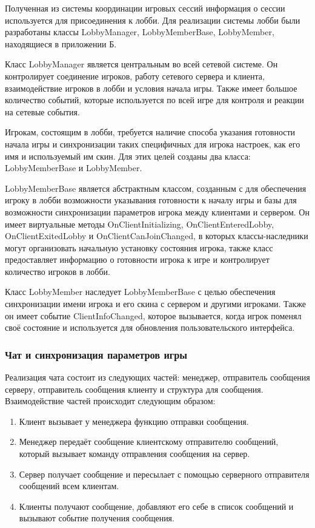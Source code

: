 Полученная из системы координации игровых сессий информация о сессии используется для присоединения к лобби. Для реализации системы лобби были разработаны классы LobbyManager, LobbyMemberBase, LobbyMember, находящиеся в приложении Б.

Класс LobbyManager является центральным во всей сетевой системе. Он контролирует соединение игроков, работу сетевого сервера и клиента, взаимодействие игроков в лобби и условия начала игры. Также имеет большое количество событий, которые используется по всей игре для контроля и реакции на сетевые события.

Игрокам, состоящим в лобби, требуется наличие способа указания готовности начала игры и синхронизации таких специфичных для игрока настроек, как его имя и используемый им скин. Для этих целей созданы два класса: LobbyMemberBase и LobbyMember.

LobbyMemberBase является абстрактным классом, созданным с для обеспечения игроку в лобби возможности указывания готовности к началу игры и базы для возможности синхронизации параметров игрока между клиентами и сервером. Он имеет виртуальные методы OnClientInitializing, OnClientEnteredLobby, OnClientExitedLobby и OnClientCanJoinChanged, в которых классы-наследники могут организовать начальную установку состояния игрока, также класс предоставляет информацию о готовности игрока к игре и контролирует количество игроков в лобби.

Класс LobbyMember наследует LobbyMemberBase с целью обеспечения синхронизации имени игрока и его скина с сервером и другими игроками. Также он имеет событие ClientInfoChanged, которое вызывается, когда игрок поменял своё состояние и используется для обновления пользовательского интерфейса.

\subsubsection{Чат и синхронизация параметров игры}

Реализация чата состоит из следующих частей: менеджер, отправитель сообщения серверу, отправитель сообщения клиенту и структура для сообщения. Взаимодействие частей происходит следующим образом:
\begin{enumerate}[label=\arabic*, itemindent=\parindent + 2.25ex]
  \item Клиент вызывает у менеджера функцию отправки сообщения.
  \item Менеджер передаёт сообщение клиентскому отправителю сообщений, который вызывает команду отправления сообщения на сервер.
  \item Сервер получает сообщение и пересылает с помощью серверного отправителя сообщений всем клиентам.
  \item Клиенты получают сообщение, добавляют его себе в список сообщений и вызывают событие получения сообщения.
\end{enumerate}

